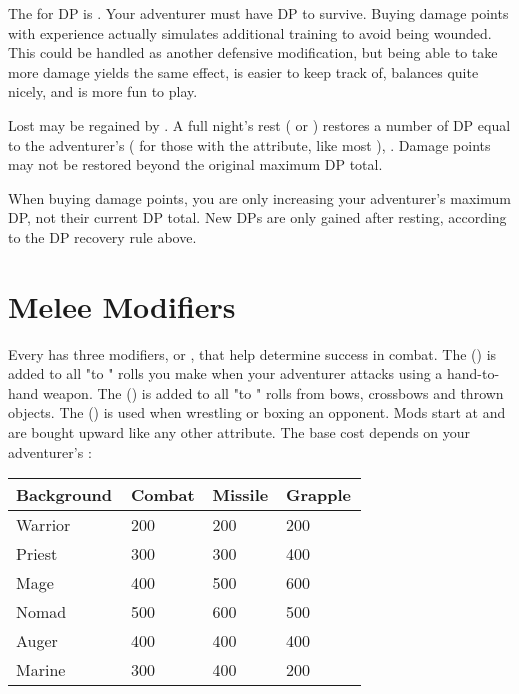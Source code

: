 \begin{multicols*}{2}
The  for DP is . Your adventurer must have DP to survive. Buying damage points with experience actually simulates additional training to avoid being wounded. This could be handled as another defensive modification, but being able to take more damage yields the same effect, is easier to keep track of, balances quite nicely, and is more fun to play.

Lost \DP may be regained by . A full night's rest ( or ) restores a number of DP equal to the adventurer's \HEA {} ( for those with the  attribute, like most ), . Damage points may not be restored beyond the original maximum DP total.

When buying damage points, you are only increasing your adventurer's maximum DP, not their current DP total. New DPs are only gained after resting, according to the DP recovery rule above.

\section{Melee Modifiers}
Every  has three modifiers, or , that help determine success in combat. The  (\CM) is added to all  "to " rolls you make when your adventurer attacks using a hand-to-hand weapon. The  (\MM) is added to all "to " rolls from bows, crossbows and thrown objects. The  (\GM) is used when wrestling or boxing an opponent. Mods start at  and are bought upward like any other attribute. The base cost depends on your adventurer's :

\begin{normboxc}
\small
\begin{tabular}{@{} p{0.25\linewidth} p{0.15\linewidth} p{0.15\linewidth} p{0.15\linewidth}}
\textbf{Background} & \textbf{Combat} & \textbf{Missile} & \textbf{Grapple}\\
\midrule
Warrior & 200 & 200 & 200\\
Priest & 300 & 300 & 400\\
Mage & 400 & 500 & 600\\
Nomad & 500 & 600 & 500\\
Auger & 400 & 400 & 400\\
Marine & 300 & 400 & 200\\
\end{tabular}
\end{normboxc}


\end{multicols*}
